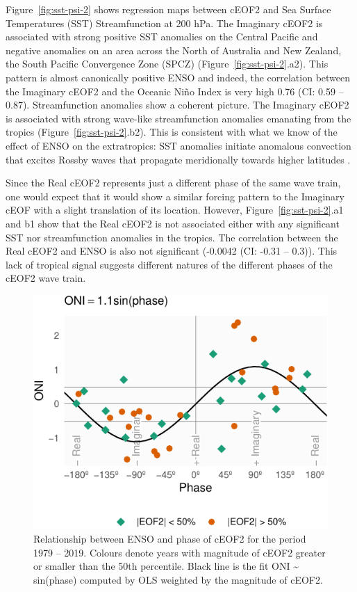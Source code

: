 \documentclass[smallextended]{svjour3}       %
\begin{document}
Figure~\ref{fig:sst-psi-2} shows regression maps between cEOF2 and Sea Surface Temperatures (SST) Streamfunction at 200 hPa. The Imaginary cEOF2 is associated with strong positive SST anomalies on the Central Pacific and negative anomalies on an area across the North of Australia and New Zealand, the South Pacific Convergence Zone (SPCZ) (Figure~\ref{fig:sst-psi-2}.a2). This pattern is almost canonically positive ENSO and indeed, the correlation between the Imaginary cEOF2 and the Oceanic Niño Index \citep{bamston1997} is very high 0.76 (CI: 0.59 -- 0.87). Streamfunction anomalies show a coherent picture. The Imaginary cEOF2 is associated with strong wave-like streamfunction anomalies emanating from the tropics (Figure~\ref{fig:sst-psi-2}.b2). This is consistent with what we know of the effect of ENSO on the extratropics: SST anomalies initiate anomalous convection that excites Rossby waves that propagate meridionally towards higher latitudes \citep{mo2000}.

Since the Real cEOF2 represents just a different phase of the same wave train, one would expect that it would show a similar forcing pattern to the Imaginary cEOF with a slight translation of its location. However, Figure~\ref{fig:sst-psi-2}.a1 and b1 show that the Real cEOF2 is not associated either with any significant SST nor streamfunction anomalies in the tropics. The correlation between the Real cEOF2 and ENSO is also not significant (-0.0042 (CI: -0.31 -- 0.3)). This lack of tropical signal suggests different natures of the different phases of the cEOF2 wave train.

\begin{figure}
\centering
\includegraphics{../figures/enso-phase-1.pdf}
\caption{\label{fig:enso-phase}Relationship between ENSO and phase of cEOF2 for the period 1979 -- 2019. Colours denote years with magnitude of cEOF2 greater or smaller than the 50th percentile. Black line is the fit ONI \textasciitilde{} sin(phase) computed by OLS weighted by the magnitude of cEOF2.}
\end{figure}
\end{document}
